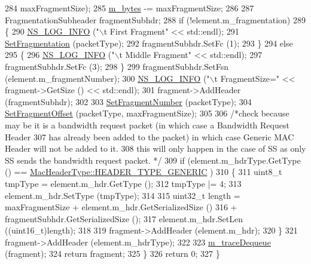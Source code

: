 \begin{DoxyCode}
284                                                      maxFragmentSize);
285       \hyperlink{classns3_1_1WimaxMacQueue_a79c3fd93dfef8c78b074c2aa6f2266ea}{m\_bytes} -= maxFragmentSize;
286 
287       FragmentationSubheader fragmentSubhdr;
288       \textcolor{keywordflow}{if} (!element.m\_fragmentation)
289         \{
290           \hyperlink{group__logging_gafbd73ee2cf9f26b319f49086d8e860fb}{NS\_LOG\_INFO} (\textcolor{stringliteral}{"\(\backslash\)t First Fragment"} << std::endl);
291           \hyperlink{classns3_1_1WimaxMacQueue_a7f76b9df9eb4acabad4609839ecda8f1}{SetFragmentation} (packetType);
292           fragmentSubhdr.SetFc (1);
293         \}
294       \textcolor{keywordflow}{else}
295         \{
296           \hyperlink{group__logging_gafbd73ee2cf9f26b319f49086d8e860fb}{NS\_LOG\_INFO} (\textcolor{stringliteral}{"\(\backslash\)t Middle Fragment"} << std::endl);
297           fragmentSubhdr.SetFc (3);
298         \}
299       fragmentSubhdr.SetFsn (element.m\_fragmentNumber);
300       \hyperlink{group__logging_gafbd73ee2cf9f26b319f49086d8e860fb}{NS\_LOG\_INFO} (\textcolor{stringliteral}{"\(\backslash\)t FragmentSize="} << fragment->GetSize () << std::endl);
301       fragment->AddHeader (fragmentSubhdr);
302 
303       \hyperlink{classns3_1_1WimaxMacQueue_a7dc69d2eec5b050e18852796e502610e}{SetFragmentNumber} (packetType);
304       \hyperlink{classns3_1_1WimaxMacQueue_a9cbf603913fc930f22d8ba27c14838e1}{SetFragmentOffset} (packetType, maxFragmentSize);
305 
306       \textcolor{comment}{/*check because may be it is a bandwidth request packet (in which case a Bandwidth Request Header}
307 \textcolor{comment}{        has already been added to the packet) in which case Generic MAC Header will not be added to it.}
308 \textcolor{comment}{            this will only happen in the case of SS as only SS sends the bandwidth request packet. */}
309       \textcolor{keywordflow}{if} (element.m\_hdrType.GetType () == \hyperlink{classns3_1_1MacHeaderType_a54d8fc8bc93a2b7865627965cdd31c20a48fe5b2f20cadf78008c71469b518403}{MacHeaderType::HEADER\_TYPE\_GENERIC}
      )
310         \{
311           uint8\_t tmpType = element.m\_hdr.GetType ();
312           tmpType |= 4;
313           element.m\_hdr.SetType (tmpType);
314 
315           uint32\_t length = maxFragmentSize + element.m\_hdr.GetSerializedSize ()
316             + fragmentSubhdr.GetSerializedSize ();
317           element.m\_hdr.SetLen ((uint16\_t)length);
318 
319           fragment->AddHeader (element.m\_hdr);
320         \}
321       fragment->AddHeader (element.m\_hdrType);
322 
323       \hyperlink{classns3_1_1WimaxMacQueue_a3a84896e087a831d26cb904927e8cbed}{m\_traceDequeue} (fragment);
324       \textcolor{keywordflow}{return} fragment;
325     \}
326   \textcolor{keywordflow}{return} 0;
327 \}
\end{DoxyCode}


